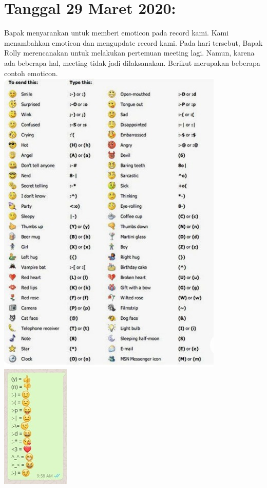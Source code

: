 \documentclass{article}
\begin{document}
\section{Tanggal 29 Maret 2020:}
Bapak menyarankan untuk memberi emoticon pada record kami. Kami menambahkan emoticon dan mengupdate record kami. Pada hari tersebut, Bapak Rolly merencanakan untuk melakukan pertemuan meeting lagi. Namun, karena ada beberapa hal, meeting tidak jadi dilaksanakan. Berikut merupakan beberapa contoh emoticon.
\newline
\includegraphics[scale=0.3]{29.1.jpg}
\newline
\includegraphics[scale=0.8]{29.2.jpg}
\newline
\end{document}
